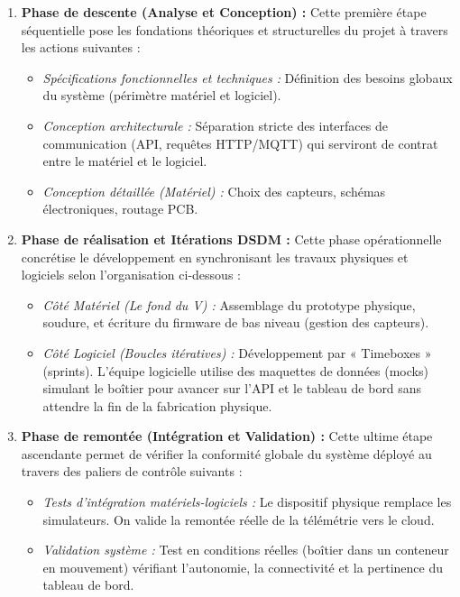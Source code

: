 \begin{enumerate}
    \item \textbf{Phase de descente (Analyse et Conception) :}
    Cette première étape séquentielle pose les fondations théoriques et structurelles du projet à travers les actions suivantes :
    \begin{itemize}
        \item \emph{Spécifications fonctionnelles et techniques :} Définition des besoins globaux du système (périmètre matériel et logiciel).
        \item \emph{Conception architecturale :} Séparation stricte des interfaces de communication (API, requêtes HTTP/MQTT) qui serviront de contrat entre le matériel et le logiciel.
        \item \emph{Conception détaillée (Matériel) :} Choix des capteurs, schémas électroniques, routage PCB.
    \end{itemize}
    
    \item \textbf{Phase de réalisation et Itérations DSDM :}
    Cette phase opérationnelle concrétise le développement en synchronisant les travaux physiques et logiciels selon l'organisation ci-dessous :
    \begin{itemize}
        \item \emph{Côté Matériel (Le fond du V) :} Assemblage du prototype physique, soudure, et écriture du firmware de bas niveau (gestion des capteurs).
        \item \emph{Côté Logiciel (Boucles itératives) :} Développement par « Timeboxes » (sprints). L'équipe logicielle utilise des maquettes de données (mocks) simulant le boîtier pour avancer sur l'API et le tableau de bord sans attendre la fin de la fabrication physique.
    \end{itemize}
    
    \item \textbf{Phase de remontée (Intégration et Validation) :}
    Cette ultime étape ascendante permet de vérifier la conformité globale du système déployé au travers des paliers de contrôle suivants :
    \begin{itemize}
        \item \emph{Tests d'intégration matériels-logiciels :} Le dispositif physique remplace les simulateurs. On valide la remontée réelle de la télémétrie vers le cloud.
        \item \emph{Validation système :} Test en conditions réelles (boîtier dans un conteneur en mouvement) vérifiant l'autonomie, la connectivité et la pertinence du tableau de bord.
    \end{itemize}
\end{enumerate}


